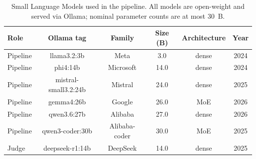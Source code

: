 \begin{table}[!htbp]
\centering
\caption{Small Language Models used in the pipeline. All models are open-weight and served via Ollama; nominal parameter counts are at most 30~B.}
\label{tab:model_lineup}
\begin{tabular}{@{}lccccc@{}}
\toprule
Role & Ollama tag & Family & Size (B) & Architecture & Year \\
\midrule
Pipeline & llama3.2:3b          & Meta          &  3.0 & dense & 2024 \\
Pipeline & phi4:14b             & Microsoft     & 14.0 & dense & 2024 \\
Pipeline & mistral-small3.2:24b & Mistral       & 24.0 & dense & 2025 \\
Pipeline & gemma4:26b           & Google        & 26.0 & MoE   & 2026 \\
Pipeline & qwen3.6:27b          & Alibaba       & 27.0 & dense & 2026 \\
Pipeline & qwen3-coder:30b      & Alibaba-coder & 30.0 & MoE   & 2025 \\
\midrule
Judge    & deepseek-r1:14b      & DeepSeek      & 14.0 & dense & 2025 \\
\bottomrule
\end{tabular}
\end{table}
